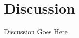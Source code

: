 \documentclass[../main/Replicate.tex]{subfiles}
\begin{document}
\section{Discussion}
Discussion Goes Here	
\end{document}
